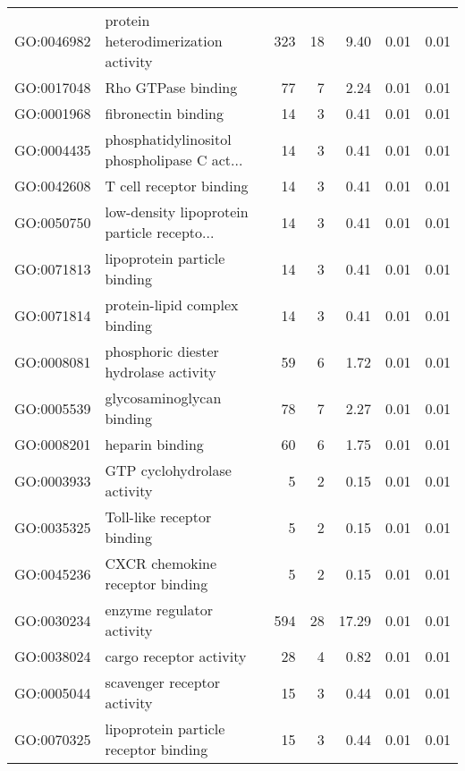 \begin{table}[ht]
\begin{tabular}{llrrrrr}
  GO:0046982 & protein heterodimerization activity & 323 &  18 & 9.40 & 0.01 & 0.01 \\ 
  GO:0017048 & Rho GTPase binding &  77 &   7 & 2.24 & 0.01 & 0.01 \\ 
  GO:0001968 & fibronectin binding &  14 &   3 & 0.41 & 0.01 & 0.01 \\ 
  GO:0004435 & phosphatidylinositol phospholipase C act... &  14 &   3 & 0.41 & 0.01 & 0.01 \\ 
  GO:0042608 & T cell receptor binding &  14 &   3 & 0.41 & 0.01 & 0.01 \\ 
  GO:0050750 & low-density lipoprotein particle recepto... &  14 &   3 & 0.41 & 0.01 & 0.01 \\ 
  GO:0071813 & lipoprotein particle binding &  14 &   3 & 0.41 & 0.01 & 0.01 \\ 
  GO:0071814 & protein-lipid complex binding &  14 &   3 & 0.41 & 0.01 & 0.01 \\ 
  GO:0008081 & phosphoric diester hydrolase activity &  59 &   6 & 1.72 & 0.01 & 0.01 \\ 
  GO:0005539 & glycosaminoglycan binding &  78 &   7 & 2.27 & 0.01 & 0.01 \\ 
  GO:0008201 & heparin binding &  60 &   6 & 1.75 & 0.01 & 0.01 \\ 
  GO:0003933 & GTP cyclohydrolase activity &   5 &   2 & 0.15 & 0.01 & 0.01 \\ 
  GO:0035325 & Toll-like receptor binding &   5 &   2 & 0.15 & 0.01 & 0.01 \\ 
  GO:0045236 & CXCR chemokine receptor binding &   5 &   2 & 0.15 & 0.01 & 0.01 \\ 
  GO:0030234 & enzyme regulator activity & 594 &  28 & 17.29 & 0.01 & 0.01 \\ 
  GO:0038024 & cargo receptor activity &  28 &   4 & 0.82 & 0.01 & 0.01 \\ 
  GO:0005044 & scavenger receptor activity &  15 &   3 & 0.44 & 0.01 & 0.01 \\ 
  GO:0070325 & lipoprotein particle receptor binding &  15 &   3 & 0.44 & 0.01 & 0.01 \\ 
   \hline
\end{tabular}
\end{table}
